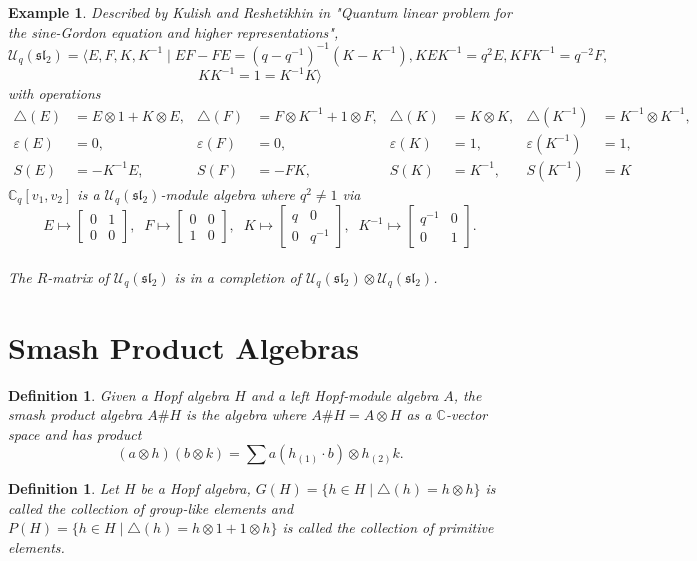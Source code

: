 \documentclass[12pt,a4paper]{article}
\newtheorem{example}[theorem]{Example}
\newtheorem{definition}[theorem]{Definition}
\newcommand\1{_{(1)}}
\newcommand\2{_{(2)}}
\begin{document}
\begin{example}
Described by Kulish and Reshetikhin in "Quantum linear problem for the sine-Gordon equation and higher representations", 
\[
\mathcal{U}_q(\mathfrak{sl_2})=\langle E,F,K,K^{-1}\;\vert\; EF-FE=(q-q^{-1})^{-1}(K-K^{-1}), KEK^{-1}=q^2E, KFK^{-1}=q^{-2}F, \]\[KK^{-1}=1=K^{-1}K\rangle
\]
with operations
\begin{align*}
\triangle(E)&=E\otimes 1+K\otimes E, & \triangle(F)&=F\otimes K^{-1}+1\otimes F, & \triangle(K)&=K\otimes K, & \triangle(K^{-1})&=K^{-1}\otimes K^{-1},\\
\varepsilon(E)&=0, & \varepsilon(F)&=0, & \varepsilon(K)&=1, & \varepsilon(K^{-1})&=1,\\
S(E)&=-K^{-1}E, & S(F)&=-FK, & S(K)&=K^{-1}, & S(K^{-1})&=K
\end{align*}
$\mathbb{C}_q[v_1,v_2]$ is a $\mathcal{U}_q(\mathfrak{sl_2})$-module algebra where $q^2\neq 1$ via 
\[
    E\mapsto \begin{bmatrix}0&1\\0&0\end{bmatrix},\;\; F\mapsto \begin{bmatrix}0&0\\1&0\end{bmatrix},\;\; K\mapsto \begin{bmatrix}q&0\\0&q^{-1}\end{bmatrix},\;\; K^{-1}\mapsto\begin{bmatrix} q^{-1}&0\\0&1\end{bmatrix}.
\]
\\The $R$-matrix of $\mathcal{U}_q(\mathfrak{sl_2})$ is in a completion of $\mathcal{U}_q(\mathfrak{sl_2})\otimes \mathcal{U}_q(\mathfrak{sl_2})$.
\end{example}

\section{Smash Product Algebras}

\begin{definition}
Given a Hopf algebra $H$ and a left Hopf-module algebra $A$, the smash product algebra $A\# H$ is the algebra where $A\#H=A\otimes H$ as a $\mathbb{C}$-vector space and has product
\[
(a\otimes h)(b\otimes k)=\sum a(h\1\cdot b)\otimes h\2 k.
\]
\end{definition}

\begin{definition}
    Let $H$ be a Hopf algebra, $G(H)=\{h\in H\;\vert\; \triangle(h)=h\otimes h\}$ is called the collection of group-like elements and $P(H)=\{h\in H\;\vert\; \triangle(h)=h\otimes 1+1\otimes h\}$ is called the collection of primitive elements.
\end{definition}
\end{document}
